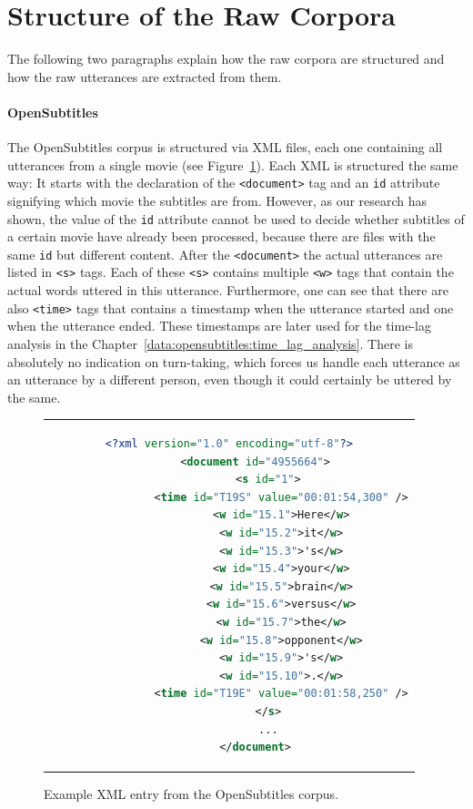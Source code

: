 \section{Structure of the Raw Corpora}
\label{data:structure_of_corpora}
The following two paragraphs explain how the raw corpora are structured and how the raw utterances are extracted from them.

\paragraph{OpenSubtitles} The OpenSubtitles corpus is structured via XML files, each one containing all utterances from a single movie (see Figure~\ref{data:opensubtitles:xml_example}). Each XML is structured the same way: It starts with the declaration of the \texttt{<document>} tag and an \texttt{id} attribute signifying which movie the subtitles are from. However, as our research has shown, the value of the \texttt{id} attribute cannot be used to decide whether subtitles of a certain movie have already been processed, because there are files with the same \texttt{id} but different content. After the \texttt{<document>} the actual utterances are listed in \texttt{<s>} tags. Each of these \texttt{<s>} contains multiple \texttt{<w>} tags that contain the actual words uttered in this utterance. Furthermore, one can see that there are also \texttt{<time>} tags that contains a timestamp when the utterance started and one when the utterance ended. These timestamps are later used for the time-lag analysis in the Chapter~\ref{data:opensubtitles:time_lag_analysis}. There is absolutely no indication on turn-taking, which forces us handle each utterance as an utterance by a different person, even though it could certainly be uttered by the same.\\


\begin{figure}[thp]
	\centering
	\begin{tabular}{c}  %
		\begin{lstlisting}[language=XML]
		<?xml version="1.0" encoding="utf-8"?>
		<document id="4955664">
			<s id="1">
				<time id="T19S" value="00:01:54,300" />
				<w id="15.1">Here</w>
				<w id="15.2">it</w>
				<w id="15.3">'s</w>
				<w id="15.4">your</w>
				<w id="15.5">brain</w>
				<w id="15.6">versus</w>
				<w id="15.7">the</w>
				<w id="15.8">opponent</w>
				<w id="15.9">'s</w>
				<w id="15.10">.</w>
				<time id="T19E" value="00:01:58,250" />
			</s>
			...
		</document>
		\end{lstlisting}
	\end{tabular}
	\caption{Example XML entry from the OpenSubtitles corpus.}
	\label{data:opensubtitles:xml_example}
\end{figure}

